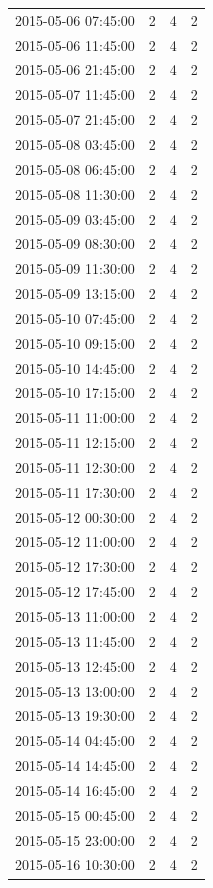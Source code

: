 \begin{tabular}{lrrr}
2015-05-06 07:45:00 & 2 & 4 & 2 \\
2015-05-06 11:45:00 & 2 & 4 & 2 \\
2015-05-06 21:45:00 & 2 & 4 & 2 \\
2015-05-07 11:45:00 & 2 & 4 & 2 \\
2015-05-07 21:45:00 & 2 & 4 & 2 \\
2015-05-08 03:45:00 & 2 & 4 & 2 \\
2015-05-08 06:45:00 & 2 & 4 & 2 \\
2015-05-08 11:30:00 & 2 & 4 & 2 \\
2015-05-09 03:45:00 & 2 & 4 & 2 \\
2015-05-09 08:30:00 & 2 & 4 & 2 \\
2015-05-09 11:30:00 & 2 & 4 & 2 \\
2015-05-09 13:15:00 & 2 & 4 & 2 \\
2015-05-10 07:45:00 & 2 & 4 & 2 \\
2015-05-10 09:15:00 & 2 & 4 & 2 \\
2015-05-10 14:45:00 & 2 & 4 & 2 \\
2015-05-10 17:15:00 & 2 & 4 & 2 \\
2015-05-11 11:00:00 & 2 & 4 & 2 \\
2015-05-11 12:15:00 & 2 & 4 & 2 \\
2015-05-11 12:30:00 & 2 & 4 & 2 \\
2015-05-11 17:30:00 & 2 & 4 & 2 \\
2015-05-12 00:30:00 & 2 & 4 & 2 \\
2015-05-12 11:00:00 & 2 & 4 & 2 \\
2015-05-12 17:30:00 & 2 & 4 & 2 \\
2015-05-12 17:45:00 & 2 & 4 & 2 \\
2015-05-13 11:00:00 & 2 & 4 & 2 \\
2015-05-13 11:45:00 & 2 & 4 & 2 \\
2015-05-13 12:45:00 & 2 & 4 & 2 \\
2015-05-13 13:00:00 & 2 & 4 & 2 \\
2015-05-13 19:30:00 & 2 & 4 & 2 \\
2015-05-14 04:45:00 & 2 & 4 & 2 \\
2015-05-14 14:45:00 & 2 & 4 & 2 \\
2015-05-14 16:45:00 & 2 & 4 & 2 \\
2015-05-15 00:45:00 & 2 & 4 & 2 \\
2015-05-15 23:00:00 & 2 & 4 & 2 \\
2015-05-16 10:30:00 & 2 & 4 & 2 \\

\end{tabular}
